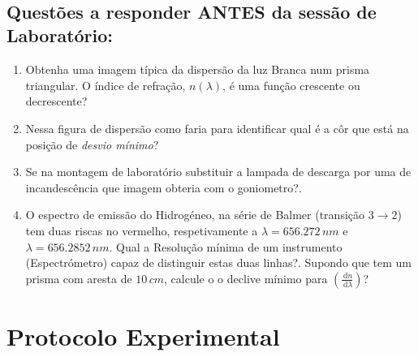 \documentclass[a4paper,12pt]{article}  %
\newcommand{\ud}{\,\mathrm{d}}
\begin{document}
~
\newpage
\subsection{\sf Questões a responder ANTES da sessão de Laboratório:}
\begin{enumerate}
\item Obtenha uma imagem típica da dispersão da luz Branca num prisma triangular. O índice de refração, $n(\lambda)$, é uma função crescente ou decrescente?
\item Nessa figura de dispersão como faria para  identificar qual é a côr que está na posição de \emph{desvio mínimo}?
\item Se na montagem de laboratório substituir a lampada de descarga por uma de incandescência que imagem obteria com o goniometro?. 
\item O espectro de emissão do Hidrogéneo, na série de Balmer (transição $3 \to 2$) tem duas riscas no vermelho, respetivamente a $\lambda = 656.272\, nm$ e $\lambda = 656.2852\,nm$.
Qual a Resolução mínima de um instrumento (Espectrómetro) capaz de distinguir estas duas linhas?. Supondo que tem um prisma com aresta de $10\,cm$, calcule o 
o declive mínimo para $\left(\frac{\ud n}{\ud \lambda} \right)$?
\end{enumerate}


\section{\sf Protocolo Experimental}
\end{document}
